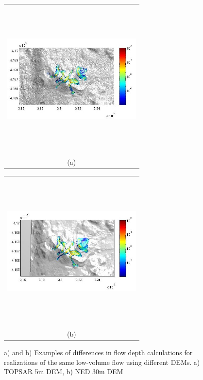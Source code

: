 \documentclass[a4paper,fleqn]{article}
\newcommand{\Pic}[2][0.85]{\begin{center}\texttt{[image: \#2]}
 \end{center} }
\begin{document}
\begin{figure}[H]
    \begin{minipage}[b]{0.6\textwidth}
        \begin{tabular}{c}
	\includegraphics[width=7cm,height=8cm,keepaspectratio]{Mammoth_low.jpg}\\
        (a)
        \end{tabular}
    \end{minipage}
    \begin{minipage}{0.6\textwidth}
        \begin{tabular}{c}
	\includegraphics[width=7cm,height=8cm,keepaspectratio]{ned30_low.jpg}\\
        (b)
        \end{tabular}
    \end{minipage} 
\caption{a) and b) Examples of differences in flow depth calculations for realizations of the same low-volume flow using different DEMs. 
a) TOPSAR 5m DEM, b) NED 30m DEM}
\label{fig2}  

\end{figure}
\end{document}
